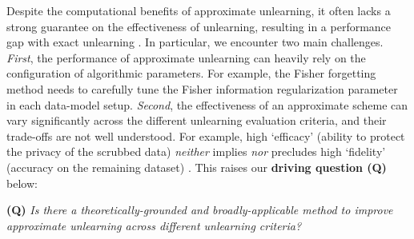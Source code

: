 Despite the computational benefits of  approximate unlearning, it often  lacks a strong guarantee on the effectiveness  of unlearning, resulting in a performance gap with  exact unlearning \cite{thudi2022necessity}.  In particular, we encounter two main challenges.
\textit{First}, the performance of approximate unlearning   can heavily rely on the configuration of algorithmic parameters.
For example, the Fisher forgetting method \cite{golatkar2020eternal} needs to carefully tune the Fisher information regularization parameter  in each   data-model setup.  
\textit{Second}, the effectiveness of an approximate scheme can vary significantly across the different unlearning evaluation criteria, and their trade-offs are not well understood. For example,  high `efficacy' (ability to protect the privacy of the scrubbed data)
\textit{neither} implies \textit{nor} precludes high `fidelity' (accuracy on the remaining dataset) \cite{becker2022evaluating}. This raises our \textbf{driving question (Q)}  below:
\vspace*{3mm}
\begin{tcolorbox}[before skip=-2.1mm, after skip=0.2cm, boxsep=0.0cm, middle=0.1cm, top=0.1cm, bottom=0.1cm]
\textbf{(Q)} \textit{Is there a theoretically-grounded and broadly-applicable method to improve approximate unlearning across different unlearning criteria?}
\end{tcolorbox}



